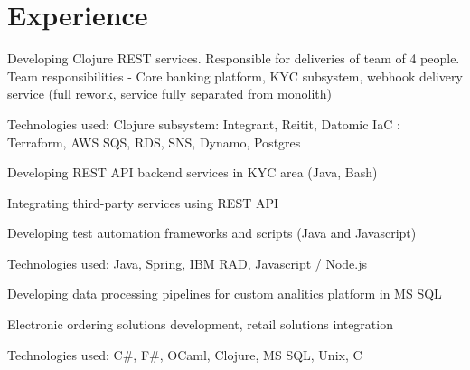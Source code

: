\documentclass[]{plushcv}
\begin{document}
\begin{minipage}[t]{0.70\textwidth} 



\section{Experience}
\begin{tightemize}
\sectionsep
\item Developing Clojure REST services. Responsible for deliveries of team of 4 people. Team responsibilities - Core banking platform, KYC subsystem, webhook delivery service (full rework, service fully separated from monolith)
\item Technologies used: \textbullet{} Clojure subsystem: Integrant, Reitit, Datomic \textbullet{} IaC : Terraform, AWS SQS, RDS, SNS, Dynamo, Postgres
\end{tightemize}
\sectionsep

\begin{tightemize}
\sectionsep
\item Developing REST API backend services in KYC area (Java, Bash)
\item Integrating third-party services using REST API
\item Developing test automation frameworks and scripts (Java and Javascript) 
\item Technologies used: Java, Spring, IBM RAD, Javascript / Node.js
\end{tightemize}
\sectionsep

\begin{tightemize}
\sectionsep
\item Developing data processing pipelines for custom analitics platform in MS SQL
\end{tightemize}
\sectionsep

\begin{tightemize}
\sectionsep
\item Electronic ordering solutions development, retail solutions integration
\item Technologies used: C\#, F\#, OCaml, Clojure, MS SQL, Unix, C
\end{tightemize}
\sectionsep


\end{minipage}
\end{document}

